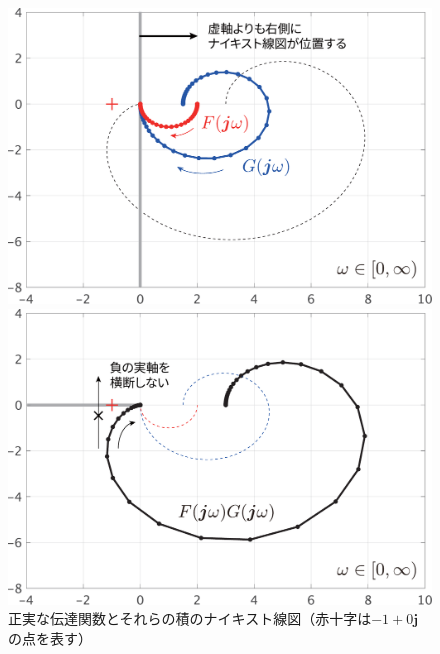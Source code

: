 \documentclass[tombow,dvipdfmx]{corona-a5}
\begin{document}
\begin{figure}[t]
  \centering
  {
  \begin{minipage}{0.49\linewidth}
    \centering
    \includegraphics[width = .90\linewidth]{figs/nyquistFG}
  \end{minipage}
  \begin{minipage}{0.49\linewidth}
    \centering
    \includegraphics[width = .90\linewidth]{figs/nyquistFGop}
  \end{minipage}
  \caption{正実な伝達関数とそれらの積のナイキスト線図（赤十字は$-1 + 0 \bm{j}$の点を表す）}
  \label{fig:nyquistpr}
  }
\end{figure}
\end{document}
